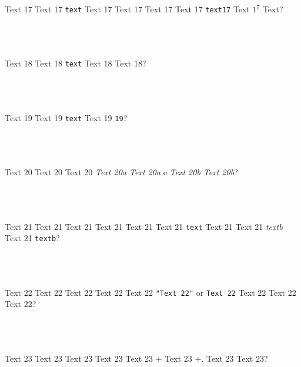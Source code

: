 \documentclass[9pt]{exam}
\begin{document}
\begin{questions}
\question
    Text 17 Text 17 \texttt{text} Text 17 Text 17 Text 17
    Text 17 \texttt{text17} Text $1^7$ Text?\\\\
    \makebox[0.9\textwidth]{\$ \enspace\hrulefill}\\\\
    \makebox[0.9\textwidth]{\enspace\hrulefill}

\question
    Text 18 Text 18 \texttt{text} Text 18 Text $18$?\\\\
    \makebox[0.9\textwidth]{\$ \enspace\hrulefill}\\\\
    \makebox[0.9\textwidth]{\enspace\hrulefill}

\question
    Text 19 Text 19 \texttt{text} Text 19 \texttt{19}?\\\\
    \makebox[0.9\textwidth]{\$ \enspace\hrulefill}\\\\
    \makebox[0.9\textwidth]{\enspace\hrulefill}

\question
    Text 20 Text 20 Text 20 \emph{Text 20a Text 20a} e
    \emph{Text 20b Text 20b}?\\\\
    \makebox[0.9\textwidth]{\$ \enspace\hrulefill}\\\\
    \makebox[0.9\textwidth]{\enspace\hrulefill}

\question
    Text 21 Text 21 Text 21 Text 21 Text 21 Text 21 \texttt{text}
    Text 21 Text 21 \emph{textb} Text 21 \texttt{textb}?\\\\
    \makebox[0.9\textwidth]{\$ \enspace\hrulefill}\\\\
    \makebox[0.9\textwidth]{\enspace\hrulefill}

\question
    Text 22 Text 22 Text 22 Text 22 Text 22 \texttt{"Text 22"}
    or
    \texttt{\textquotesingle{}Text 22\textquotesingle{}}
    Text 22 Text 22 Text 22?\\\\
    \makebox[0.9\textwidth]{\$ \enspace\hrulefill}\\\\
    \makebox[0.9\textwidth]{\enspace\hrulefill}

\question
    Text 23 Text 23 Text 23 Text 23 Text 23 \Ctrl+
    Text 23 \Ctrl+. Text 23 Text 23?\\\\
    \makebox[0.9\textwidth]{\$ \enspace\hrulefill}\\\\
    \makebox[0.9\textwidth]{\enspace\hrulefill}


\end{questions}
\end{document}
